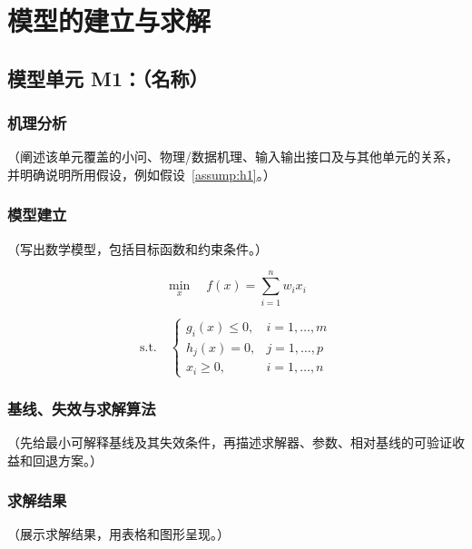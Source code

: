 \documentclass[12pt, a4paper]{article}
\begin{document}
\section{模型的建立与求解}

\subsection{模型单元 M1：（名称）}

\subsubsection{机理分析}

（阐述该单元覆盖的小问、物理/数据机理、输入输出接口及与其他单元的关系，并明确说明所用假设，例如假设~\ref{assump:h1}。）

\subsubsection{模型建立}

（写出数学模型，包括目标函数和约束条件。）

\begin{equation}
    \min_{x} \quad f(x) = \sum_{i=1}^{n} w_i x_i
    \label{eq:obj1}
\end{equation}

\begin{equation}
    \text{s.t.} \quad
    \begin{cases}
        g_i(x) \leq 0, & i = 1, \ldots, m \\
        h_j(x) = 0,    & j = 1, \ldots, p \\
        x_i \geq 0,    & i = 1, \ldots, n
    \end{cases}
    \label{eq:constraint1}
\end{equation}

\subsubsection{基线、失效与求解算法}

（先给最小可解释基线及其失效条件，再描述求解器、参数、相对基线的可验证收益和回退方案。）

\subsubsection{求解结果}

（展示求解结果，用表格和图形呈现。）
\end{document}
